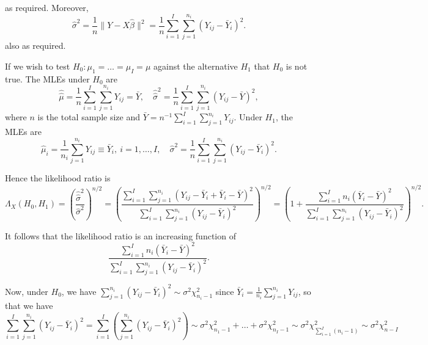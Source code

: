 as required. Moreover,
\begin{equation}
\hat{\sigma}^2 = \frac{1}{n}\|Y-X\hat{\beta}\|^2 = \frac{1}{n}\sum^I_{i=1}\sum^{n_i}_{j=1}\left(Y_{ij} -\bar{Y}_i\right)^2.
\end{equation}
also as required.

If we wish to test $H_0: \mu_1=\dots=\mu_I=\mu$ against the alternative $H_1$ that $H_0$ is not true. The MLEs under $H_0$ are
\begin{equation}
\hat{\hat{\mu}}=\frac{1}{n}\sum^I_{i=1}\sum^{n_i}_{j=1}Y_{ij} = \bar{Y},\quad \hat{\hat{\sigma}}^2 = \frac{1}{n}\sum^I_{i=1}\sum^{n_i}_{j=1}\left(Y_{ij} -\bar{Y}\right)^2,
\end{equation}
where $n$ is the total sample size and $\bar{Y} = n^{-1}\sum^I_{i=1}\sum^{n_i}_{j=1}Y_{ij}$. Under $H_1$, the MLEs are
\begin{equation}
\hat{\mu}_i = \frac{1}{n_i}\sum^{n_i}_{j=1}Y_{ij} \equiv \bar{Y}_i, \ i=1,\dots,I,\quad \hat{\sigma}^2 = \frac{1}{n}\sum^I_{i=1}\sum^{n_i}_{j=1}\left(Y_{ij} -\bar{Y}_i\right)^2.
\end{equation}

Hence the likelihood ratio is
\begin{equation}
\Lambda_{X}(H_0,H_1) = \left(\frac{\hat{\hat{\sigma}}^2}{\hat{\sigma}^2}\right)^{n/2} = \left(\frac{\sum^I_{i=1}\sum^{n_i}_{j=1}\left(Y_{ij} -\bar{Y}_i+\bar{Y}_i - \bar{Y}\right)^2}{\sum^I_{i=1}\sum^{n_i}_{j=1}\left(Y_{ij} -\bar{Y}_i\right)^2}\right)^{n/2}  = \left(1+\frac{\sum^I_{i=1} n_i\left(\bar{Y}_i - \bar{Y}\right)^2}{\sum^I_{i=1}\sum^{n_i}_{j=1}\left(Y_{ij} -\bar{Y}_i\right)^2}\right)^{n/2}.
\end{equation}

It follows that the likelihood ratio is an increasing function of
\begin{equation}
\frac{\sum^I_{i=1} n_i\left(\bar{Y}_i - \bar{Y}\right)^2}{\sum^I_{i=1}\sum^{n_i}_{j=1}\left(Y_{ij} -\bar{Y}_i\right)^2}.
\end{equation}

Now, under $H_0$, we have $\sum^{n_i}_{j=1}\left(Y_{ij} -\bar{Y}_i\right)^2\sim\sigma^2\chi_{n_i-1}^2$ since $\bar{Y}_i = \frac{1}{n_i}\sum^{n_i}_{j=1}Y_{ij}$, so that we have
\begin{equation}
\sum^I_{i=1}\sum^{n_i}_{j=1}\left(Y_{ij} -\bar{Y}_i\right)^2 = \sum^I_{i=1}\left( \sum^{n_i}_{j=1}\left(Y_{ij} -\bar{Y}_i\right)^2\right)\sim \sigma^2\chi_{n_1-1}^2 +\dots + \sigma^2\chi_{n_I-1}^2 \sim \sigma^2\chi_{\sum^I_{i=1}(n_i-1)}^2 \sim \sigma^2\chi_{n-I}^2
\end{equation}

